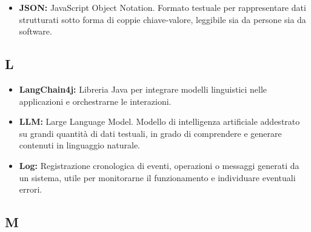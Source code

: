 \begin{itemize}
    \item \textbf{JSON:} JavaScript Object Notation. Formato testuale per rappresentare dati strutturati sotto forma di coppie chiave-valore, leggibile sia da persone sia da software.
\end{itemize}


{}
\subsection*{L}

\begin{itemize}
    \item \textbf{LangChain4j:} Libreria Java per integrare modelli linguistici nelle applicazioni e orchestrarne le interazioni.
    \item \textbf{LLM:} Large Language Model. Modello di intelligenza artificiale addestrato su grandi quantità di dati testuali, in grado di comprendere e generare contenuti in linguaggio naturale.
    \item \textbf{Log:} Registrazione cronologica di eventi, operazioni o messaggi generati da un sistema, utile per monitorarne il funzionamento e individuare eventuali errori.
\end{itemize}


{}
\subsection*{M}


